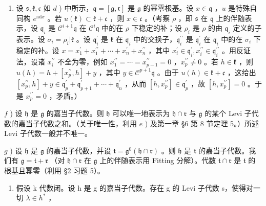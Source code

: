 \begin{enumerate}
\item
  设 \(\mathfrak{s},\mathfrak{k},\mathfrak{c}\) 如 \(d\) ) 中所示，\(\mathfrak{q}=[\mathfrak{g},\mathfrak{r}]\) 是 \(\mathfrak{g}\) 的幂零根基。设 \(x\in\mathfrak{q}\) ，\(u\) 是特殊自同构 \(e^{\mathrm{ad}x}\) 。若 \(u(\mathfrak{k})\subset\mathfrak{k}+\mathfrak{c}\) ，则 \(x\in\mathfrak{c}\) 。（考察 \(\rho\) ，即 \(\mathfrak{s}\) 在 \(\mathfrak{q}\) 上的伴随表示，设 \(\mathfrak{q}_{i}\) 是 \(\mathcal{C}^{i+1}\mathfrak{q}\) 在 \(\mathcal{C}^{i}\mathfrak{q}\) 中的在 \(\rho\) 下稳定的补；设 \(\rho_{i}\) 是 \(\rho\) 的由 \(\mathfrak{q}_{i}\) 定义的子表示。设 \(\sigma_{i}=\rho_{i}|\mathfrak{k}\) 。设 \(\mathfrak{q}_{i}^{\prime}\) 是 \(\mathfrak{k}\) 在 \(\mathfrak{q}_{i}\) 中的交换子，\(\mathfrak{q}_{i}^{\prime\prime}\) 是 \(\mathfrak{q}_{i}^{\prime}\) 在 \(\mathfrak{q}_{i}\) 中的在 \(\sigma_{i}\) 下稳定的补。设 \(x=x_{1}^{\prime}+x_{1}^{\prime\prime}+\cdots+x_{n}^{\prime}+x_{n}^{\prime\prime}\) ，其中 \(x_{i}^{\prime}\in\mathfrak{q}_{i}^{\prime},x_{i}^{\prime\prime}\in\mathfrak{q}_{i}^{\prime\prime}\) 。用反证法，设诸 \(x_{i}^{\prime\prime}\) 不全为零，例如 \(x_{1}^{\prime\prime}=\cdots=x_{p-1}^{\prime\prime}=0\) ，\(x_{p}^{\prime\prime}\neq0\) 。若 \(h\in\mathfrak{k}\) ，则 \(u(h)=h+[x_{p}^{\prime\prime},h]+y\) ，其中 \(y\in\mathcal{C}^{p+1}\mathfrak{q}\) 。由于 \(u(h)\in\mathfrak{k}+\mathfrak{c}\) ，这给出 \([x_{p}^{\prime\prime},h]+y\in\mathfrak{q}_{p}^{\prime}+\mathfrak{q}_{p+1}^{\prime}+\cdots+\mathfrak{q}_{n}^{\prime}\) ，从而 \([h,x_{p}^{\prime\prime}]\in\mathfrak{q}_{p}^{\prime}\) ，故 \([h,x_{p}^{\prime\prime}]=0\) 。于是 \(x_{p}^{\prime\prime}=0\) ，矛盾。）
\end{enumerate}

\(f\) ) 设 \(\mathfrak{h}\) 是 \(\mathfrak{g}\) 的嘉当子代数。则 \(\mathfrak{h}\) 可以唯一地表示为 \(\mathfrak{h} \cap \mathfrak{r}\) 与 \(\mathfrak{g}\) 的某个 Levi 子代数的嘉当子代数之和。（关于唯一性，利用 \(e\) ) 及第一章 §6 第 8 节定理 5。）所述 Levi 子代数一般并不唯一。

\(g\) ) 设 \(\mathfrak{h}\) 是 \(\mathfrak{g}\) 的嘉当子代数，并设 \(\mathfrak{t} = \mathfrak{g}^0 (\mathfrak{h} \cap \mathfrak{r})\) 。则 \(\mathfrak{h}\) 是 \(\mathfrak{t}\) 的嘉当子代数。我们有 \(\mathfrak{g} = \mathfrak{t} + \mathfrak{r}\) （对 \(\mathfrak{h} \cap \mathfrak{r}\) 在 \(\mathfrak{g}\) 上的伴随表示用 Fitting 分解）。代数 \(\mathfrak{t} \cap \mathfrak{r}\) 是 \(\mathfrak{t}\) 的根基且幂零（利用 §2 习题 5）。

\begin{enumerate}
\def\labelenumi{\alph{enumi})}
\setcounter{enumi}{7}
\tightlist
\item
  假设 k 代数闭。设 h 是 g 的嘉当子代数。存在 g 的 Levi 子代数 s，使得对一切 \(\lambda \in h^{*}\) ，
\end{enumerate}

